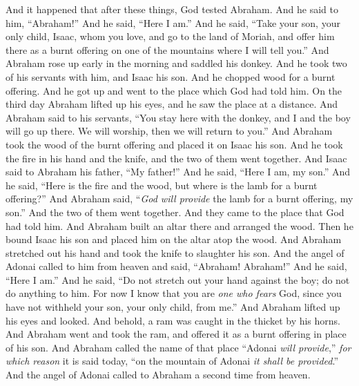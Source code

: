 \begin{biblechapter} %
 And it happened that after these things, God tested Abraham. And he said to him, “Abraham!” And he said, “Here I am.”
\verse And he said, “Take your son, your only child, Isaac, whom you love, and go to the land of Moriah, and offer him there as a burnt offering on one of the mountains where I will tell you.”
\verse And Abraham rose up early in the morning and saddled his donkey. And he took two of his servants with him, and Isaac his son. And he chopped wood for a burnt offering. And he got up and went to the place which God had told him.
\verse On the third day Abraham lifted up his eyes, and he saw the place at a distance.
\verse And Abraham said to his servants, “You stay here with the donkey, and I and the boy will go up there. We will worship, then we will return to you.”
\verse And Abraham took the wood of the burnt offering and placed it on Isaac his son. And he took the fire in his hand and the knife, and the two of them went together.
\verse And Isaac said to Abraham his father, “My father!” And he said, “Here I am, my son.” And he said, “Here is the fire and the wood, but where is the lamb for a burnt offering?”
\verse And Abraham said, “\textit{God will provide} the lamb for a burnt offering, my son.” And the two of them went together.
\verse And they came to the place that God had told him. And Abraham built an altar there and arranged the wood. Then he bound Isaac his son and placed him on the altar atop the wood.
\verse And Abraham stretched out his hand and took the knife to slaughter his son.
\verse And the angel of Adonai called to him from heaven and said, “Abraham! Abraham!” And he said, “Here I am.”
\verse And he said, “Do not stretch out your hand against the boy; do not do anything to him. For now I know that you are \textit{one who fears} God, since you have not withheld your son, your only child, from me.”
\verse And Abraham lifted up his eyes and looked. And behold, a ram was caught in the thicket by his horns. And Abraham went and took the ram, and offered it as a burnt offering in place of his son.
\verse And Abraham called the name of that place “Adonai \textit{will provide},” \textit{for which reason} it is said today, “on the mountain of Adonai \textit{it shall be provided}.”
\verse And the angel of Adonai called to Abraham a second time from heaven.

\end{biblechapter}
